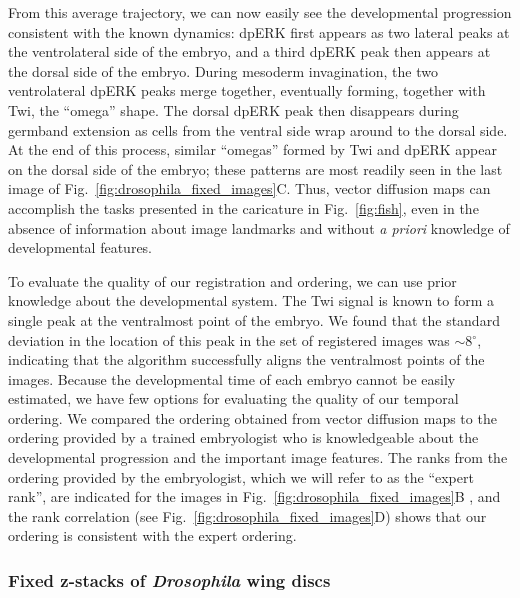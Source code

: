 \documentclass[twocolumn, 10pt]{article}
\newcommand{\fig}[0]{Fig.}
\begin{document}
From this average trajectory, we can now easily see the developmental progression consistent with the known dynamics:
%
dpERK first appears as two lateral peaks at the ventrolateral side of the embryo, and a third dpERK peak then appears at the dorsal side of the embryo.
%
During mesoderm invagination, the two ventrolateral dpERK peaks merge together, eventually forming, together with Twi, the ``omega'' shape.
%
The dorsal dpERK peak then disappears during germband extension as cells from the ventral side wrap around to the dorsal side.
%
At the end of this process, similar ``omegas'' formed by Twi and dpERK appear on the dorsal side of the embryo; these patterns are most readily seen in the last image of \fig~\ref{fig:drosophila_fixed_images}C.
%
Thus, vector diffusion maps can accomplish the tasks presented in the caricature in \fig~\ref{fig:fish}, even in the absence of information about image landmarks and without {\it a priori} knowledge of developmental features.
%

To evaluate the quality of our registration and ordering, we can use prior knowledge about the developmental system.
%
The Twi signal is known to form a single peak at the ventralmost point of the embryo.
%
We found that the standard deviation in the location of this peak in the set of registered images was $\sim$8$^\circ$,
indicating that the algorithm successfully aligns the ventralmost points of the images.
%
Because the developmental time of each embryo cannot be easily estimated, we have few options for evaluating the quality of our temporal ordering.
%
We compared the ordering obtained from vector diffusion maps to the ordering provided by a trained embryologist who is knowledgeable about the developmental progression and the important image features.
%
The ranks from the ordering provided by the embryologist, which we will refer to as the ``expert rank'', are indicated for the images in \fig~\ref{fig:drosophila_fixed_images}B , and the rank correlation (see \fig~\ref{fig:drosophila_fixed_images}D) shows that our ordering is consistent with the expert ordering.



\subsubsection*{Fixed z-stacks of {\em Drosophila} wing discs}
\end{document}
